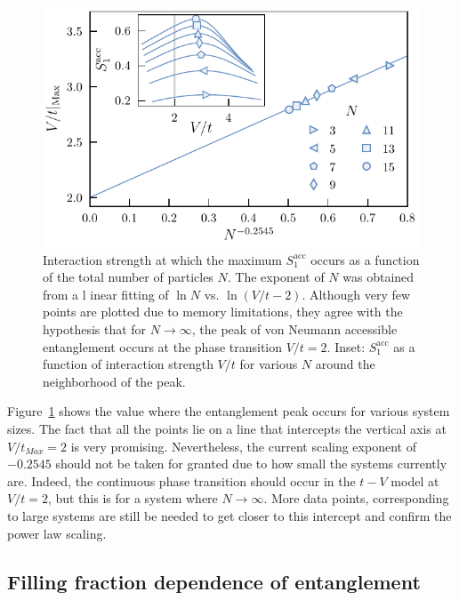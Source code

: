 	\begin{figure}[htp]
	\begin{center}
	\includegraphics[width=1.0\columnwidth]{peakScalingOddN.pdf}
	\end{center}
	\caption{Interaction strength at which the maximum $S_{1}^{\mathrm{acc}}$ occurs as a 	function of the total number of particles $N$. The exponent of $N$ was obtained from a l	inear fitting of $\ln N$ vs. $\ln{(V/t - 2)}$.  Although very few points are plotted due to 	memory limitations, they agree with the hypothesis that for $N \to \infty$, the peak of 	von Neumann accessible entanglement occurs at the phase transition $V/t = 2$. Inset: 	$S_{1}^{\mathrm{acc}}$ as a function of interaction strength $V/t$ for various $N$ 		around the neighborhood of the peak.}
	\label{fig:peakScalingOddN}
	\end{figure}
	
	Figure~{\ref{fig:peakScalingOddN}} shows the value where the entanglement peak occurs for various system sizes. The fact that all the points lie on a line that intercepts the vertical axis at $V/t_{Max}=2$ is very promising. Nevertheless, the current scaling exponent of $-0.2545$ should not be taken for granted due to how small the systems currently are. Indeed, the continuous phase transition should occur in the $t-V$ model at $V/t=2$, but this is for a system where $N \to \infty$. More data points, corresponding to large systems are still be needed to get closer to this intercept and confirm the power law scaling.
	
	\subsection{Filling fraction dependence of entanglement}
	
